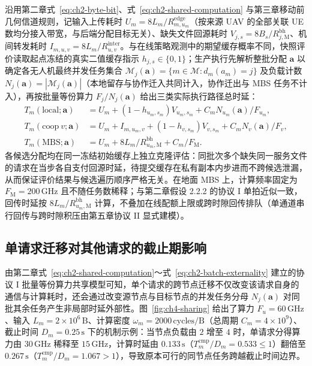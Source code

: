 沿用第二章式~\eqref{eq:ch2-byte-bit}、式~\eqref{eq:ch2-shared-computation} 与第三章移动前几何信道规则，记输入上传耗时 $U_m=8L_m/R^{\mathrm{edge}}_{m,u_m}$（按来源 UAV 的全部关联 UE 数均分接入带宽，与后端分配目标无关）、缺失文件回源耗时 $V_{j,s}=8B_s/R^{\mathrm{bh}}_{j,\mathrm M}$、机间转发耗时 $I_{m,u,v}=8L_m/R^{\mathrm{inter}}_{u,v}$。与在线策略观测中的期望缓存概率不同，快照评价读取起点冻结的真实二值缓存指示 $h_{j,s}\in\{0,1\}$；生产执行先解析整批分配 $\mathbf{a}$ 以确定各无人机最终并发任务集合 $\mathcal{M}_j(\mathbf{a})=\{m\in\mathcal{M}:d_m(a_m)=j\}$ 及负载计数 $N_j(\mathbf{a})=|\mathcal{M}_j(\mathbf{a})|$（本地留存与协作迁入共同计入，协作迁出与 MBS 任务不计入），再按批量等份算力 $F_j/N_j(\mathbf{a})$ 给出三类实际执行路径总时延：
\begin{equation}
 \begin{aligned}
 T_m(\mathrm{local};\mathbf a)&=U_m+(1-h_{u_m,s_m})V_{u_m,s_m}
                    +C_mN_{u_m}(\mathbf a)/F_{u_m},\\
 T_m(\mathrm{coop}\ v;\mathbf a)&=U_m+I_{m,u_m,v}
                +(1-h_{v,s_m})V_{v,s_m}+C_mN_v(\mathbf a)/F_v,\\
 T_m(\mathrm{MBS};\mathbf a)&=U_m+8L_m/R^{\mathrm{bh}}_{u_m,\mathrm M}
                    +C_m/F_{\mathrm M}.
 \end{aligned}
 \label{eq:ch4-actual-service-paths}
\end{equation}
各候选分配均在同一冻结初始缓存上独立克隆评估：同批次多个缺失同一服务文件的请求在当步各自支付回源时延，待提交缓存在私有副本内步进而不跨候选泄漏，从而保证评价结果与候选遍历顺序严格无关。在地面 MBS 上，计算频率固定为 $F_{\mathrm M}=200\,\mathrm{GHz}$ 且不随任务数稀释；与第二章假设 2.2.2 的协议 I 单拍近似一致，回传时延按 $8L_m/R^{\mathrm{bh}}_{u_m,\mathrm M}$ 计算，不叠加在线配额上限或跨时隙回传排队（单通道串行回传与跨时隙积压由第五章协议 II 显式建模）。

\subsection{单请求迁移对其他请求的截止期影响}
\label{sec:sharing-externality}
\label{sec:ch4-marginal-objective}

由第二章式~\eqref{eq:ch2-shared-computation}～式~\eqref{eq:ch2-batch-externality} 建立的协议 I 批量等份算力共享模型可知，单个请求的跨节点迁移不仅改变该请求自身的通信与计算耗时，还会通过改变源节点与目标节点的并发任务分母 $N_j(\mathbf{a})$ 对同批其余任务产生非局部时延外部性。图~\ref{fig:ch4-sharing} 给出了算力 $F_u=60\,\mathrm{GHz}$、输入 $L_m=2\times10^6\,\mathrm{B}$、计算密度 $\omega_m=2000\,\mathrm{cycles/B}$（总周期 $C_m=4\times10^9$）、截止时间 $D_m=0.25\,\mathrm{s}$ 下的机制示例：当节点负载由 $2$ 增至 $4$ 时，单请求分得算力由 $30\,\mathrm{GHz}$ 稀释至 $15\,\mathrm{GHz}$，计算时延由 $0.133\,\mathrm{s}$（$T_m^{\mathrm{cmp}}/D_m=0.533\leq 1$）翻倍至 $0.267\,\mathrm{s}$（$T_m^{\mathrm{cmp}}/D_m=1.067>1$），导致原本可行的同节点任务跨越截止时间边界。


